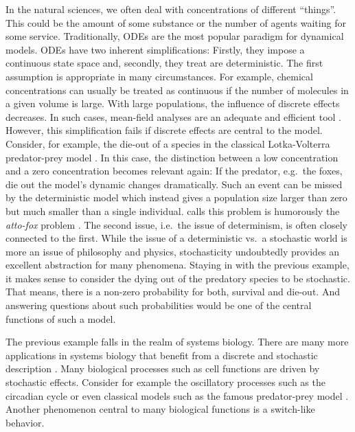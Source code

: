 In the natural sciences, we often deal with concentrations of different ``things''.
This could be the amount of some substance or the number of agents waiting for some service.
Traditionally, \aclp{ODE} are the most popular paradigm for dynamical models.
\Aclp{ODE} have two inherent simplifications: Firstly, they impose a continuous state space and, secondly, they treat are deterministic.
The first assumption is appropriate in many circumstances.
For example, chemical concentrations can usually be treated as continuous if the number of molecules in a given volume is large.
With large populations, the influence of discrete effects decreases.
In such cases, mean-field analyses are an adequate and efficient tool \parencite{bortolussi2013continuous}.
However, this simplification fails if discrete effects are central to the model.
Consider, for example, the die-out of a species in the classical Lotka-Volterra predator-prey model \parencite{lotka1925elements}.
In this case, the distinction between a low concentration and a zero concentration becomes relevant again:
If the predator, e.g.\ the foxes, die out the model's dynamic changes dramatically.
Such an event can be missed by the deterministic model which instead gives a population size larger than zero but much smaller than a single individual.
 calls this problem is humorously the \emph{atto-fox} problem \parencite{mollison1991dependence}.
The second issue, i.e.\ the issue of determinism, is often closely connected to the first.
While the issue of a deterministic vs.\ a stochastic world is more an issue of philosophy and physics, stochasticity undoubtedly provides an excellent abstraction for many phenomena.
Staying in with the previous example, it makes sense to consider the dying out of the predatory species to be stochastic.
That means, there is a non-zero probability for both, survival and die-out.
And answering questions about such probabilities would be one of the central functions of such a model.

The previous example falls in the realm of systems biology.
There are many more applications in systems biology that benefit from a discrete and stochastic description \parencite{wilkinson2018stochastic,BuchWolkenhauer}.
Many biological processes such as cell functions are driven by stochastic effects.
Consider for example the oscillatory processes such as the circadian cycle \parencite{asgari2019mathematical} or even classical models such as the famous predator-prey model \parencite{lotka1925elements}.
Another phenomenon central to many biological functions is a switch-like behavior.


